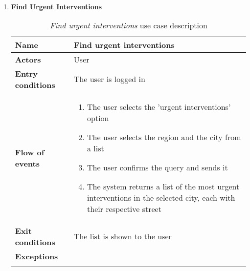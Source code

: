 \begin{enumerate}
		\item \textbf{Find Urgent Interventions}
			\begin{longtable}{p{0.25\linewidth}p{0.75\linewidth}}
				\toprule
				\textbf{Name} & \textbf{Find urgent interventions} \\
				\midrule
				\textbf{Actors} & User \\
				\midrule
				\textbf{Entry conditions} & The user is logged in \\
				\midrule
				\textbf{Flow of events} & 
				\begin{enumerate}
					\item The user selects the 'urgent interventions' option
					\item The user selects the region and the city from a list
					\item The user confirms the query and sends it
					\item The system returns a list of the most urgent interventions in the selected city, each with their respective street
				\end{enumerate} \\
				\midrule
				\textbf{Exit conditions} & The list is shown to the user\\
				\midrule
				\textbf{Exceptions} &  \\
				\bottomrule
				\caption{\emph{Find urgent interventions} use case description}
			\end{longtable}
		

\end{enumerate}
